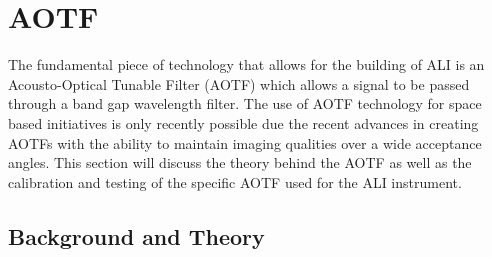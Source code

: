 \section{AOTF}

The fundamental piece of technology that allows for the building of ALI is an Acousto-Optical Tunable Filter (AOTF) which allows a signal to be passed through a band gap wavelength filter. The use of AOTF technology for space based initiatives is only recently possible due the recent advances in creating AOTFs with the ability to maintain imaging qualities over a wide acceptance angles. This section will discuss the theory behind the AOTF as well as the calibration and testing of the specific AOTF used for the ALI instrument.

\subsection{Background and Theory}
 
